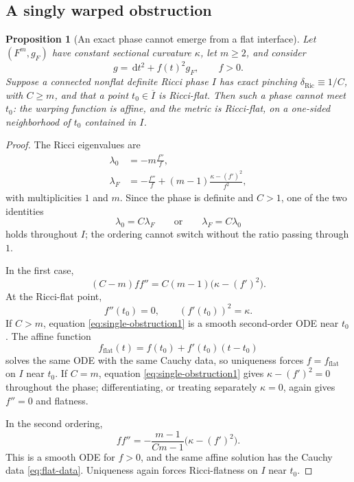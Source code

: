 \documentclass[11pt,reqno]{amsart}
\newtheorem{proposition}[theorem]{Proposition}
\theoremstyle{definition}
\theoremstyle{remark}
\newcommand{\dd}{\,\mathrm d}
\newcommand{\dric}{\delta_{\mathrm{Ric}}}
\begin{document}
\subsection{A singly warped obstruction}

\begin{proposition}[An exact phase cannot emerge from a flat interface]\label{prop:single-obstruction}
Let $(F^m,g_F)$ have constant sectional curvature $\kappa$, let $m\ge2$, and consider
\[
g=\dd t^2+f(t)^2g_F,
\qquad f>0.
\]
Suppose a connected nonflat definite Ricci phase $I$ has exact pinching $\dric\equiv1/C$, with $C\ge m$, and that a point $t_0\in\overline I$ is Ricci-flat.  Then such a phase cannot meet $t_0$: the warping function is affine, and the metric is Ricci-flat, on a one-sided neighborhood of $t_0$ contained in $I$.
\end{proposition}

\begin{proof}
The Ricci eigenvalues are
\begin{align*}
\lambda_0&=-m\frac{f''}{f},\\
\lambda_F&=-\frac{f''}{f}+(m-1)\frac{\kappa-(f')^2}{f^2},
\end{align*}
with multiplicities $1$ and $m$.  Since the phase is definite and $C>1$, one of the two identities
\[
\lambda_0=C\lambda_F
\qquad\text{or}\qquad
\lambda_F=C\lambda_0
\]
holds throughout $I$; the ordering cannot switch without the ratio passing through $1$.

In the first case,
\begin{equation}\label{eq:single-obstruction1}
(C-m)ff''=C(m-1)\bigl(\kappa-(f')^2\bigr).
\end{equation}
At the Ricci-flat point,
\begin{equation}\label{eq:flat-data}
f''(t_0)=0,
\qquad
(f'(t_0))^2=\kappa.
\end{equation}
If $C>m$, equation \eqref{eq:single-obstruction1} is a smooth second-order ODE near $t_0$.  The affine function
\[
f_{\mathrm{flat}}(t)=f(t_0)+f'(t_0)(t-t_0)
\]
solves the same ODE with the same Cauchy data, so uniqueness forces $f=f_{\mathrm{flat}}$ on $I$ near $t_0$.  If $C=m$, equation \eqref{eq:single-obstruction1} gives $\kappa-(f')^2=0$ throughout the phase; differentiating, or treating separately $\kappa=0$, again gives $f''=0$ and flatness.

In the second ordering,
\begin{equation}\label{eq:single-obstruction2}
ff''=-\frac{m-1}{Cm-1}\bigl(\kappa-(f')^2\bigr).
\end{equation}
This is a smooth ODE for $f>0$, and the same affine solution has the Cauchy data \eqref{eq:flat-data}.  Uniqueness again forces Ricci-flatness on $I$ near $t_0$.
\end{proof}
\end{document}
